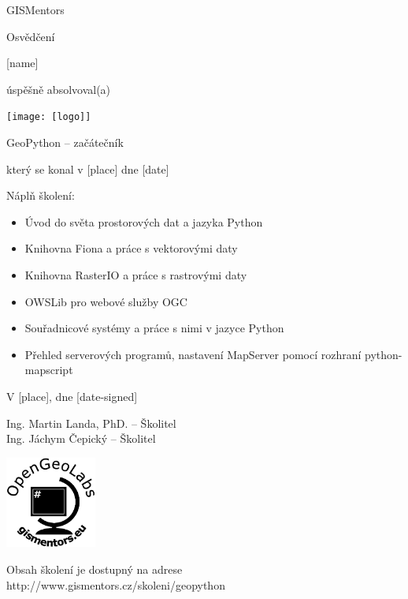 \documentclass[12pt, a4paper]{letter}
\begin{document}
\pagestyle{empty}
\begin{center}

{\Large GISMentors}

{\Huge Osvědčení}

{\Large [name]}

úspěšně absolvoval(a)

\texttt{[image: [logo]]}

{\Large GeoPython -- začátečník}

který se konal v [place] dne [date]
\end{center}

Náplň školení:

\begin{itemize}
    \item Úvod do světa prostorových dat a jazyka Python
    \item Knihovna Fiona a práce s vektorovými daty
    \item Knihovna RasterIO a práce s rastrovými daty
    \item OWSLib pro webové služby OGC
    \item Souřadnicové systémy a práce s nimi v jazyce Python
    \item Přehled serverových programů, nastavení MapServer pomocí rozhraní
            python-mapscript
\end{itemize}

\vfill
\parbox{7cm}{

    V [place], dne [date-signed]\\

\vfill

    Ing. Martin Landa, PhD. -- Školitel\\

\vfill
    Ing. Jáchym Čepický -- Školitel
}
\hfill
\parbox{3cm}{
    \includegraphics[width=3cm]{../images/placka.eps}
}

\vfill

\begin{center}
{\footnotesize Obsah školení je dostupný na adrese
http://www.gismentors.cz/skoleni/geopython}
\end{center}
\end{document}
